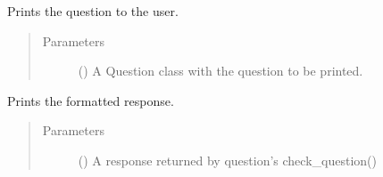 \documentclass[letterpaper,10pt,english]{sphinxmanual}
\begin{document}

\begin{fulllineitems}
\label{\detokenize{index:birdears.interfaces.commandline.print_question}}
Prints the question to the user.
\begin{quote}\begin{description}
\item[{Parameters}] \leavevmode
{} () \textendash{} A Question class with the question to be printed.

\end{description}\end{quote}

\end{fulllineitems}


\begin{fulllineitems}
\label{\detokenize{index:birdears.interfaces.commandline.print_response}}
Prints the formatted response.
\begin{quote}\begin{description}
\item[{Parameters}] \leavevmode
{} () \textendash{} A response returned by question’s check\_question()

\end{description}\end{quote}

\end{fulllineitems}
\end{document}
